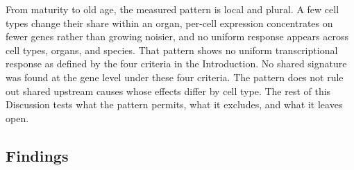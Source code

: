 \documentclass[11pt]{article}
\begin{document}
From maturity to old age, the measured pattern is local and plural. A few cell types change their share within an organ, per-cell expression concentrates on fewer genes rather than growing noisier, and no uniform response appears across cell types, organs, and species. That pattern shows no uniform transcriptional response as defined by the four criteria in the Introduction. No shared signature was found at the gene level under these four criteria. The pattern does not rule out shared upstream causes whose effects differ by cell type. The rest of this Discussion tests what the pattern permits, what it excludes, and what it leaves open.

\subsection*{Findings}
\end{document}
